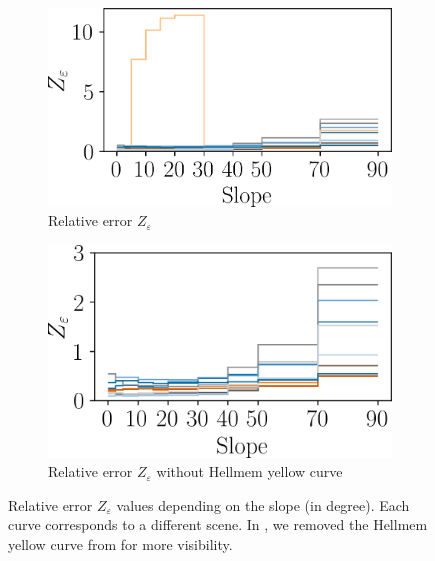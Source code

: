 \begin{figure}
    \begin{subfigure}[t]{0.495\linewidth}
        \flushleft
        \includegraphics[width=\linewidth]{Images/Chap_6/slope_eps.png}
        \caption{Relative error $Z_\varepsilon$}
        \label{fig:slope_eps_all}
    \end{subfigure}
    \begin{subfigure}[t]{0.495\linewidth}
        \flushright
        \includegraphics[width=\linewidth]{Images/Chap_6/slope_eps_no_Hellmem.png}
        \caption{Relative error $Z_\varepsilon$ without Hellmem yellow curve}
        \label{fig:slope_eps_no_hellmem}
    \end{subfigure}
    \caption{Relative error $Z_{\varepsilon}$ values depending on the slope (in degree). Each curve corresponds to a different scene. In , we removed the Hellmem yellow curve from  for more visibility.}
    \label{fig:slope_eps}
\end{figure}

